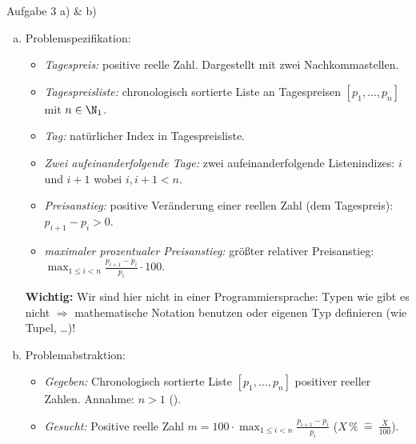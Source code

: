 \begin{frame}{Aufgabe 3 a) \& b)}
    \begin{enumerate}[a)]
        \itemsep8pt
        \item\pause \strut Problemspezifikation: \begin{itemize}[<+(1)->]
            \itemsep3pt
            \item \emph{Tagespreis:} positive reelle Zahl. Dargestellt mit zwei Nachkommastellen.
            \item \emph{Tagespreisliste:} chronologisch sortierte Liste an Tagespreisen \([p_1, \ldots, p_n]\) mit \(n \in \N_1\).
            \item \emph{Tag:} natürlicher Index in Tagespreisliste.
            \item \emph{Zwei aufeinanderfolgende Tage:} zwei aufeinanderfolgende Listenindizes: \(i\) und \(i + 1\) wobei \(i, i + 1 < n\).
            \item \emph{Preisanstieg:} positive Veränderung einer reellen Zahl (dem Tagespreis): \(p_{i + 1} - p_i > 0\).
            \item \emph{maximaler prozentualer Preisanstieg:} größter relativer Preisanstieg: \(\max_{1 \leq i < n} \frac{p_{i + 1} - p_i}{p_i} \cdot 100\).
        \end{itemize}\pause
        {\footnotesize\textbf{Wichtig:} Wir sind hier nicht in einer Programmiersprache: Typen wie  gibt es nicht $\Rightarrow$ mathematische Notation benutzen oder eigenen Typ definieren (wie Tupel, \ldots)!}
        \item\pause Problemabstraktion: \begin{itemize}[<+(1)->]
            \itemsep3pt
            \item \emph{Gegeben:} Chronologisch sortierte Liste \([p_1, \ldots, p_n]\) positiver reeller Zahlen. Annahme: \(n > 1\) ().
            \item \emph{Gesucht:} Positive reelle Zahl \(m = 100\cdot \max_{1 \leq i < n} \frac{p_{i + 1} - p_i}{p_i}\) (\(X\,\%~\widehat{=}~\frac{X}{100}\)).
        \end{itemize}
    \end{enumerate}
\end{frame}

